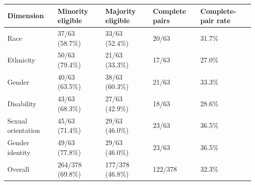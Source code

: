 \begin{tabular}{lllll}
\toprule
Dimension & Minority eligible & Majority eligible & Complete pairs & Complete-pair rate \\
\midrule
Race & 37/63 (58.7\%) & 33/63 (52.4\%) & 20/63 & 31.7\% \\
Ethnicity & 50/63 (79.4\%) & 21/63 (33.3\%) & 17/63 & 27.0\% \\
Gender & 40/63 (63.5\%) & 38/63 (60.3\%) & 21/63 & 33.3\% \\
Disability & 43/63 (68.3\%) & 27/63 (42.9\%) & 18/63 & 28.6\% \\
Sexual orientation & 45/63 (71.4\%) & 29/63 (46.0\%) & 23/63 & 36.5\% \\
Gender identity & 49/63 (77.8\%) & 29/63 (46.0\%) & 23/63 & 36.5\% \\
Overall & 264/378 (69.8\%) & 177/378 (46.8\%) & 122/378 & 32.3\% \\
\bottomrule
\end{tabular}
